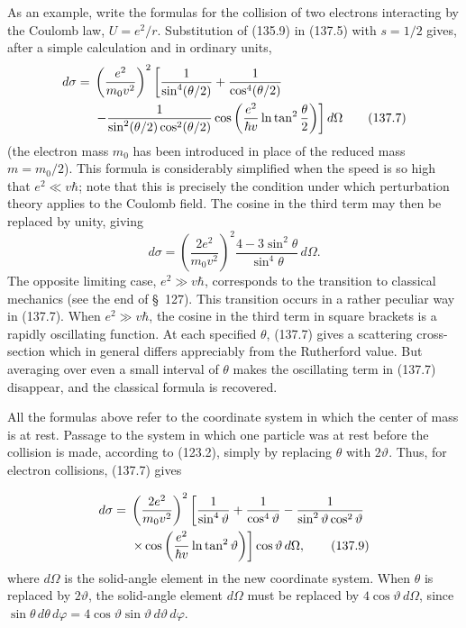 As an example, write the formulas for the collision of two electrons
interacting by the Coulomb law, $U=e^2/r$. Substitution of (135.9) in (137.5)
with $s=1/2$ gives, after a simple calculation and in ordinary units,
\begin{align}
 d\sigma={}&\left(\frac{e^2}{m_0v^2}\right)^2
 \left[\frac1{\sin^4(\theta/2)}+\frac1{\cos^4(\theta/2)}\right.\notag\\
 &\left.-\frac1{\sin^2(\theta/2)\cos^2(\theta/2)}
 \cos\left(\frac{e^2}{\hbar v}\ln\tan^2\frac\theta2\right)\right]d\Omega
 \tag{137.7}
\end{align}
(the electron mass $m_0$ has been introduced in place of the reduced mass
$m=m_0/2$). This formula is considerably simplified when the speed is so high
that $e^2\ll v\hbar$; note that this is precisely the condition under which
perturbation theory applies to the Coulomb field. The cosine in the third term
may then be replaced by unity, giving
\begin{equation}
 d\sigma=\left(\frac{2e^2}{m_0v^2}\right)^2
 \frac{4-3\sin^2\theta}{\sin^4\theta}\,d\Omega.
 \tag{137.8}
\end{equation}
The opposite limiting case, $e^2\gg v\hbar$, corresponds to the transition to
classical mechanics (see the end of \S~127). This transition occurs in a
rather peculiar way in (137.7). When $e^2\gg v\hbar$, the cosine in the third
term in square brackets is a rapidly oscillating function. At each specified
$\theta$, (137.7) gives a scattering cross-section which in general differs
appreciably from the Rutherford value. But averaging over even a small
interval of $\theta$ makes the oscillating term in (137.7) disappear, and the
classical formula is recovered.

All the formulas above refer to the coordinate system in which the center of
mass is at rest. Passage to the system in which one particle was at rest
before the collision is made, according to (123.2), simply by replacing
$\theta$ with $2\vartheta$. Thus, for electron collisions, (137.7) gives

\begin{align}
 d\sigma={}&\left(\frac{2e^2}{m_0v^2}\right)^2
 \left[\frac1{\sin^4\vartheta}+\frac1{\cos^4\vartheta}
 -\frac1{\sin^2\vartheta\cos^2\vartheta}\right.\notag\\
 &\left.\times\cos\left(\frac{e^2}{\hbar v}\ln\tan^2\vartheta\right)\right]
 \cos\vartheta\,d\Omega,
 \tag{137.9}
\end{align}
where $d\Omega$ is the solid-angle element in the new coordinate system. When
$\theta$ is replaced by $2\vartheta$, the solid-angle element $d\Omega$ must
be replaced by $4\cos\vartheta\,d\Omega$, since
$\sin\theta\,d\theta\,d\varphi=4\cos\vartheta\sin\vartheta\,d\vartheta\,d\varphi$.


